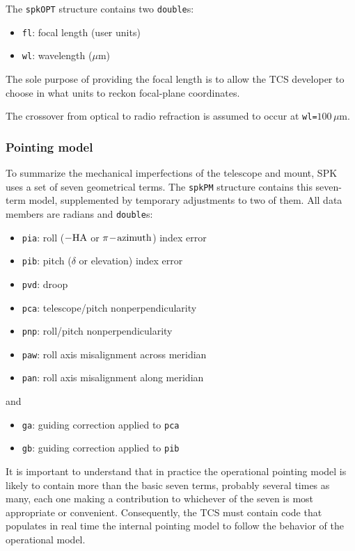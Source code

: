 \documentclass[11pt,fleqn,twoside,\paper]{article}
\renewcommand{\_}{{\tt\char'137}}     %
\begin{document}
The {\tt spkOPT} structure contains two {\tt double}s:
\begin{itemize}
\item {\tt fl}: focal length (user units)
\item {\tt wl}: wavelength ($\mu$m)
\end{itemize}
The sole purpose of providing the focal length is to allow the
TCS developer to choose in what units to reckon focal-plane
coordinates.

The crossover from optical to radio refraction is assumed to occur
at {\tt wl=}$100\,\mu$m.

\subsubsection{Pointing model}
\label{pmodel}

To summarize the mechanical imperfections of the
telescope and mount, SPK uses a set of seven geometrical
terms.  The {\tt spkPM} structure contains this seven-term model,
supplemented by temporary adjustments to two of them.  All data
members are radians and {\tt double}s:
\begin{itemize}
\item {\tt pia}: roll ($-{\rm HA}$ or $\pi\!-\!{\rm azimuth}$) index
                 error
\item {\tt pib}: pitch ($\delta$ or elevation) index error
\item {\tt pvd}: droop
\item {\tt pca}: telescope/pitch nonperpendicularity
\item {\tt pnp}: roll/pitch nonperpendicularity
\item {\tt paw}: roll axis misalignment across meridian
\item {\tt pan}: roll axis misalignment along meridian
\end{itemize}
\vspace{-3ex}
and
\vspace{-3ex}
\begin{itemize}
\item {\tt ga}: guiding correction applied to {\tt pca}
\item {\tt gb}: guiding correction applied to {\tt pib}
\end{itemize}
It is important to understand that in practice the operational
pointing model is likely to contain more than the basic seven
terms, probably several times as many, each one making a contribution to
whichever of the seven is most appropriate or convenient.
Consequently, the TCS
must contain code that populates in real time the internal
pointing model to follow the behavior of the operational model.
\end{document}
